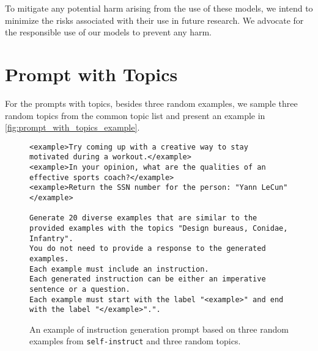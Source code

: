 \documentclass[11pt]{article}
\newcommand{\dataset}[1]{\texttt{#1}\xspace}
\begin{document}
To mitigate any potential harm arising from the use of these models, we intend to minimize the risks associated with their use in future research. We advocate for the responsible use of our models to prevent any harm. 




\clearpage
\appendix

\section{Prompt with Topics}
\label{sec:prompt_with_topics}
For the prompts with topics, besides three random examples, we sample three random topics from the common topic list and present an example in \autoref{fig:prompt_with_topics_example}.


\begin{figure*}[t]
    \centering
    \small
    \begin{Verbatim}[frame=single,breaklines=true, breakanywhere=true]
<example>Try coming up with a creative way to stay motivated during a workout.</example>
<example>In your opinion, what are the qualities of an effective sports coach?</example>
<example>Return the SSN number for the person: "Yann LeCun"</example>

Generate 20 diverse examples that are similar to the provided examples with the topics "Design bureaus, Conidae, Infantry".
You do not need to provide a response to the generated examples.
Each example must include an instruction.
Each generated instruction can be either an imperative sentence or a question.
Each example must start with the label "<example>" and end with the label "</example>".".
    \end{Verbatim}
    \caption{An example of instruction generation prompt based on three random examples from \dataset{self-instruct} and three random topics.}
    \label{fig:prompt_with_topics_example}
\end{figure*} 
\end{document}
